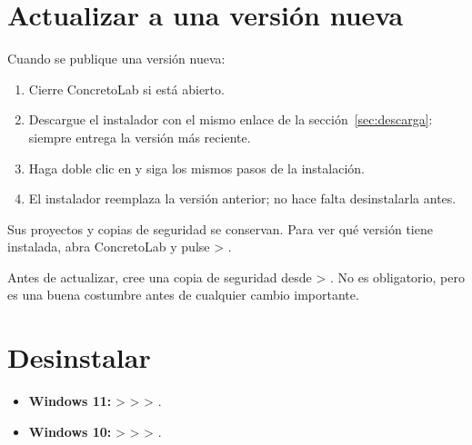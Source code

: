 \section{Actualizar a una versión nueva}

Cuando se publique una versión nueva:

\begin{enumerate}
	\item Cierre ConcretoLab si está abierto.
	\item Descargue el instalador con el mismo enlace de la sección~\ref{sec:descarga}: siempre entrega la versión
	      más reciente.
	\item Haga doble clic en \ruta{\archivoinstalador} y siga los mismos pasos de la instalación.
	\item El instalador reemplaza la versión anterior; no hace falta desinstalarla antes.
\end{enumerate}

Sus proyectos y copias de seguridad se conservan. Para ver qué versión tiene instalada, abra ConcretoLab y pulse
 \textgreater{} .

\begin{consejo}
Antes de actualizar, cree una copia de seguridad desde  \textgreater{} .
No es obligatorio, pero es una buena costumbre antes de cualquier cambio importante.
\end{consejo}

\section{Desinstalar}


\begin{itemize}
	\item \textbf{Windows 11:}  \textgreater{}  \textgreater{} 
	      \textgreater{} .
	\item \textbf{Windows 10:}  \textgreater{}  \textgreater{} 
	      \textgreater{} .
\end{itemize}

